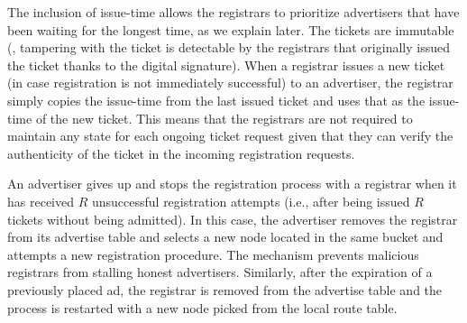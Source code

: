 The inclusion of issue-time allows the registrars to prioritize advertisers that have been waiting for the longest time, as we explain later. The tickets are immutable (\ie, tampering with the ticket is detectable by the registrars that originally issued the ticket thanks to the digital signature). When a registrar issues a new ticket (in case registration is not immediately successful) to an advertiser, the registrar simply copies the issue-time from the last issued ticket and uses that as the issue-time of the new ticket. This means that the registrars are not required to maintain any state for each ongoing ticket request given that they can verify the authenticity of the ticket in the incoming registration requests.



An advertiser gives up and stops the registration process with a registrar when it has received $R$ unsuccessful registration attempts (i.e., after being issued $R$ tickets without being admitted). In this case, the advertiser removes the registrar from its advertise table and selects a new node located in the same bucket and attempts a new registration procedure. The mechanism prevents malicious registrars from stalling honest advertisers.
Similarly, after the expiration of a previously placed ad, the registrar is removed from the advertise table and the process is restarted with a new node picked from the local route table.%

